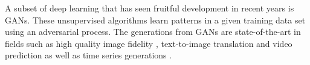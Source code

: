 \documentclass[12pt]{iopart}
\begin{document}

%
A subset of deep learning that has seen fruitful development in recent years
\cite{Goodfellow2014} is \acp{GAN}. These unsupervised algorithms learn
patterns in a given training data set using an adversarial process. The
generations from \acp{GAN} are state-of-the-art in fields such as high quality image
fidelity \cite{brock2018large,karras2019analyzing}, text-to-image translation
\cite{reed2016generative} and video prediction \cite{liang2017dual} as well as
time series generations \cite{esteban2017realvalued}. 
\end{document}
